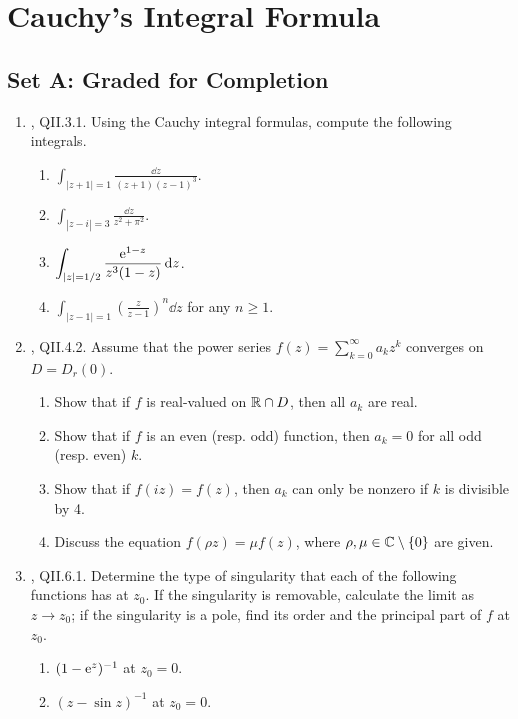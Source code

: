 \documentclass[../psets.tex]{subfiles}
\begin{document}
\section{Cauchy's Integral Formula}
\subsection*{Set A: Graded for Completion}
\begin{enumerate}[ref={A.\arabic*}]
    \item {}\textcite{bib:FischerLieb}, QII.3.1. Using the Cauchy integral formulas, compute the following integrals.
    \begin{enumerate}
        \item $\displaystyle\int_{|z+1|=1}\frac{\dd{z}}{(z+1)(z-1)^3}$.
        \item $\displaystyle\int_{|z-i|=3}\frac{\dd{z}}{z^2+\pi^2}$.
        \item $\displaystyle\int_{|z|=1/2}\frac{\e[1-z]}{z^3(1-z)}\dd{z}$.
        \item $\displaystyle\int_{|z-1|=1}\left( \frac{z}{z-1} \right)^n\dd{z}$ for any $n\geq 1$.
    \end{enumerate}
    \item \textcite{bib:FischerLieb}, QII.4.2. Assume that the power series $f(z)=\sum_{k=0}^\infty a_kz^k$ converges on $D=D_r(0)$.
    \begin{enumerate}
        \item Show that if $f$ is real-valued on $\R\cap D$, then all $a_k$ are real.
        \item Show that if $f$ is an even (resp. odd) function, then $a_k=0$ for all odd (resp. even) $k$.
        \item Show that if $f(iz)=f(z)$, then $a_k$ can only be nonzero if $k$ is divisible by 4.
        \item Discuss the equation $f(\rho z)=\mu f(z)$, where $\rho,\mu\in\C\setminus\{0\}$ are given.
    \end{enumerate}
    \item \textcite{bib:FischerLieb}, QII.6.1. Determine the type of singularity that each of the following functions has at $z_0$. If the singularity is removable, calculate the limit as $z\to z_0$; if the singularity is a pole, find its order and the principal part of $f$ at $z_0$.
    \begin{enumerate}
        \item $(1-\e[z])^{-1}$ at $z_0=0$.
        \item $(z-\sin z)^{-1}$ at $z_0=0$.

\end{enumerate}
\end{enumerate}
\end{document}
